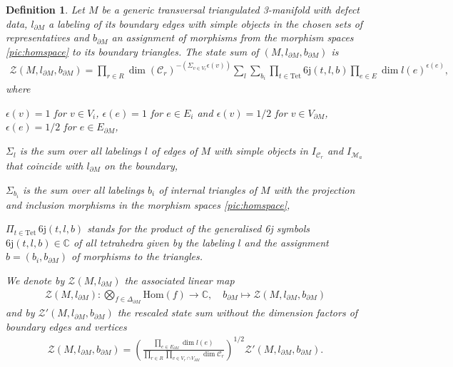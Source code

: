 \documentclass[1.5pt, a4paper]{article}
\newcommand{\C}{\mathbb{C}}
\newcommand{\mac}{\mathcal C}
\newcommand{\mam}{\mathcal M}
\newcommand{\Hom}{\mathrm{Hom}}
\newtheorem{definition}[theorem]{Definition}
\begin{document}
\begin{definition} \label{def:statesum} Let $M$ be a generic transversal triangulated  3-manifold with defect data,  $l_{\partial M}$ a labeling of its boundary edges with simple objects in the chosen sets of representatives and $b_{\partial M}$ an assignment of  morphisms from the morphism spaces \eqref{pic:homspace} to its boundary triangles. The state sum of $(M,l_{\partial M}, b_{\partial M})$ is
\begin{align}\label{eq:state sum}
\mathcal Z(M,l_{\partial M},b_{\partial M})=
\prod_{r\in R} \dim(\mathcal C_r)^{-\left(\Sigma_{v\in V_r} \epsilon(v)\right)}
\sum_{l}\sum_{b_i}   \prod_{t\in \mathrm{Tet}} \mathrm{6j}(t, l,b)\prod_{e\in E} \dim l(e)^{\epsilon(e)},
\end{align} 
where
\begin{compactitem}
\item  $\epsilon(v)=1$ for $v\in V_{i}$, $\epsilon(e)=1$ for $e\in E_i$ and $\epsilon(v)=1/2$ for $v\in V_{\partial M}$,  $\epsilon(e)=1/2$ for $e\in E_{\partial M}$,
\item $\Sigma_l$ is the sum over all labelings $l$ of  edges of $M$  with simple objects in  $I_{\mac_r}$ and $I_{\mam_a}$ that coincide with  $l_{\partial M}$ on the boundary,
\item $\Sigma_{b_i}$ is the sum over all labelings $b_i$ of internal triangles of $M$ with the projection and inclusion morphisms in the morphism spaces \eqref{pic:homspace},
\item $\Pi_{t\in \mathrm{Tet}}\, \mathrm{6j}(t, l, b)$ stands for the  product of the generalised 6j symbols $\mathrm{6j}(t, l, b)\in\C$ of all tetrahedra given by the labeling $l$ and the assignment $b=(b_i, b_{\partial M})$ of morphisms to the triangles. 
\end{compactitem}
We denote by $\mathcal Z(M, l_{\partial M})$ the associated  linear map 
\begin{align}\label{eq:statesummap}
\mathcal Z(M, l_{\partial M}): \bigotimes_{f\in \Delta_{\partial M}} \Hom(f)\to\C, \quad b_{\partial M}\mapsto \mathcal Z(M,l_{\partial M},b_{\partial M})
\end{align}
and by $\mathcal Z'(M,l_{\partial M},b_{\partial M})$ the rescaled state sum without the dimension factors of boundary edges and vertices
\begin{align}\label{eq:rescstate}
\mathcal Z(M, l_{\partial M}, b_{\partial M})=\left(\frac {\prod_{e\in E_{\partial M}} \dim l(e)} {\prod_{r\in R}\prod_{v\in V_r\cap V_{\partial M}} \dim \mac_r}  \right)^{1/2} \mathcal Z'(M, l_{\partial M}, b_{\partial M}).
\end{align}
\end{definition}
\end{document}
